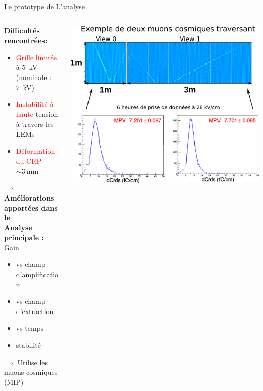     \begin{frame}{Le prototype de \TOO{}}{L'analyse}
       	\begin{scriptsize}
       		\vfill
       		\begin{columns}
       			\begin{column}{0.32\textwidth}
       				\textbf{Difficultés rencontrées:} 
       				\begin{itemize}
       					\item \textcolor{red}{Grille limitée} à \SI{5}{\kilo\volt} (nominale : \SI{7}{\kilo\volt})
       					\item \textcolor{red}{Instabilité à haute} tension à travers les LEMs
       					\item \textcolor{red}{Déformation du CRP} $\sim\SI{3}{\milli\meter}$
       				\end{itemize}
       				\textbf{$\Rightarrow$ Améliorations apportées dans le \SSS{}} \\
       				\vspace{0.3cm}
       				\textbf{Analyse principale :} Gain
       				\begin{itemize}
           				\item vs champ d'amplification
           				\item vs champ d'extraction
           				\item vs temps
           				\item stabilité
       				\end{itemize}
       				$\Rightarrow$ Utilise les muons cosmiques (MIP)
       			\end{column}\hfill
       			\begin{column}{0.72\textwidth}
       				\includegraphics[width=\textwidth]{./pictures/run840.png}\\
       			\end{column}
       		\end{columns}
	    \end{scriptsize}
    \end{frame}

